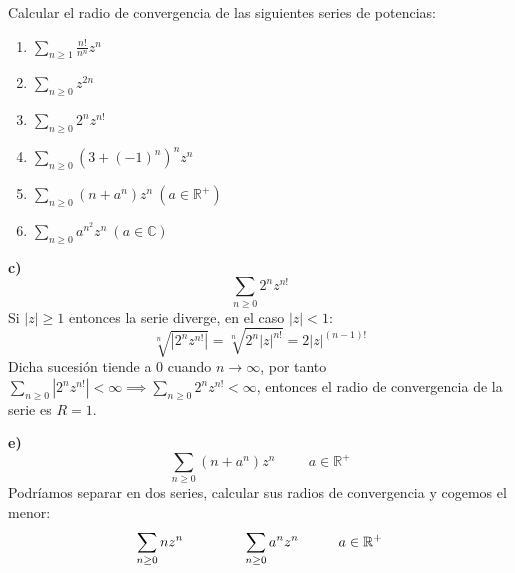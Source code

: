 \begin{ejer}
	Calcular el radio de convergencia de las siguientes series de potencias:
	\begin{enumerate}[label=(\alph*)]
		\item $\sum_{n\geq1} \frac{n!}{n^n}z^n$
		\item $\sum_{n\geq 0} z^{2n}$
		\item $\sum_{n\geq 0} 2^nz^{n!}$
		\item $\sum_{n\geq 0} (3+(-1)^n)^nz^n$
		\item $\sum_{n\geq 0} (n+a^n)z^n \ (a\in\mathbb{R}^+)$
		\item $\sum_{n\geq 0} a^{n^2}z^n \ (a\in\mathbb{C})$
	\end{enumerate}
\end{ejer}

\begin{comment}


\textbf{b)} %

$\sum_{n\geq 0} z^{2n} = \sum_{n\geq 0} \alpha_nz^n$
con $\alpha_nz{2n+1} =0, \alpha_{2n} = 1$

Vemos el límite superior de la sucesión
$\limsup |\alpha_n| = 1 \implies R=\frac{1}{1} = 1$
\end{comment}

\textbf{c)}
$$\sum_{n\geq 0} 2^nz^{n!}$$
Si $|z|\geq 1$ entonces la serie diverge, en el caso $|z|<1$:
$$\sqrt[n]{|2^nz^{n!}|} = \sqrt[n]{2^n|z|^{n!}} = 2|z|^{(n-1)!}$$
Dicha sucesión tiende a $0$ cuando $n\rightarrow\infty$, por tanto %
$\sum_{n\geq 0} |2^nz^{n!}| < \infty \implies \sum_{n\geq 0} 2^nz^{n!} < \infty$, entonces el radio de convergencia de la serie es $R=1$.



\textbf{e)}
$$\sum_{n\geq 0} (n+a^n)z^n \hspace{1cm} a\in\mathbb{R}^+$$
Podríamos separar en dos series, calcular sus radios de convergencia y cogemos el menor:
$$\sum_{n\geq 0} nz^n \hspace{1.5cm}\sum_{n\geq 0} a^nz^n\hspace{1cm} a\in\mathbb{R}^+$$
\begin{comment}
Observamos que $a^n \leq n+a^n \leq (n+1)a^n$,
en los extremos el radio de convergencia es $1/a$, por tanto el radio de convergencia de $n+a^n$ es $1/a$
$$\sum_{n\geq 0} a^n |z|^n \leq \sum_{n\geq 0} (n+a^n)|z|^n \leq \sum_{n\geq 0} (n+1)a^n|z|^n$$
Por tanto el radio de convergencia es $1/a$.
\end{comment}

